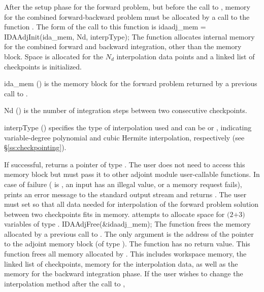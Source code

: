 After the setup phase for the forward problem, but before the call
to , memory for the combined forward-backward problem must be
allocated by a call to the function .
The form of the call to this function is
{
  idaadj\_mem = IDAAdjInit(ida\_mem, Nd, interpType);
}
{
  The function  allocates internal memory for the combined
  forward and backward integration, other than the {\idas} memory block. 
  Space is allocated for the $N_d$ interpolation data points and a linked 
  list of checkpoints is initialized.
}
{
  \begin{args}[interpType]
  \item[ida\_mem] () 
    is the {\idas} memory block for the forward problem
    returned by a previous call to .
  \item[Nd] () 
    is the number of integration steps between two consecutive checkpoints.
  \item[interpType] ()
    specifies the type of interpolation used and can be 
    or , indicating variable-degree polynomial and cubic Hermite
    interpolation, respectively (see \S\ref{ss:checkpointing}).
  \end{args}
}
{
  If successful,  returns a pointer of type . The user
  does not need to access this memory block but must pass it to other adjoint module
  user-callable functions. In case of failure ( is , an input
  has an illegal value, or a memory request fails),  prints an error
  message to the standard output stream  and returns .
}
{
  The user must set  so that all data needed for interpolation of the 
  forward problem solution between two checkpoints fits in memory. 
  attempts to allocate space for $(2$$+3)$ variables of type .
}
{
  IDAAdjFree(\&idaadj\_mem);
}
{
  The function  frees the memory allocated by
  a previous call to .
}
{
  The only argument is the address of the pointer to the adjoint memory 
  block (of type ).
}
{
  The function  has no return value.
}
{
  This function frees all memory allocated by . This includes workspace memory, 
  the linked list of checkpoints, memory for the interpolation data, as well as the {\idas} memory 
  for the backward integration phase.
}
If the user wishes to change the interpolation method after the call to ,
